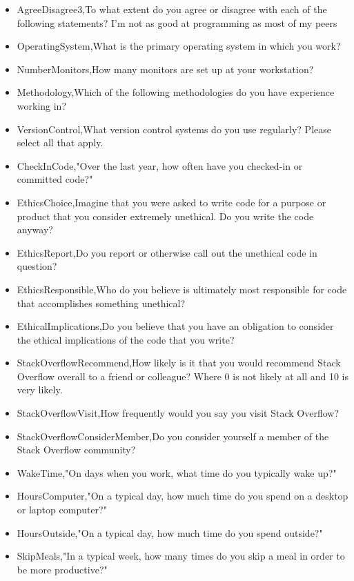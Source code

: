 \begin{appendices}
\begin{itemize}
        \item AgreeDisagree3,To what extent do you agree or disagree with each of the following statements? I'm not as good at programming as most of my peers
        \item OperatingSystem,What is the primary operating system in which you work?
        \item NumberMonitors,How many monitors are set up at your workstation?
        \item Methodology,Which of the following methodologies do you have experience working in?
        \item VersionControl,What version control systems do you use regularly? Please select all that apply.
        \item CheckInCode,"Over the last year, how often have you checked-in or committed code?"
        \item EthicsChoice,Imagine that you were asked to write code for a purpose or product that you consider extremely unethical. Do you write the code anyway?
        \item EthicsReport,Do you report or otherwise call out the unethical code in question?
        \item EthicsResponsible,Who do you believe is ultimately most responsible for code that accomplishes something unethical?
        \item EthicalImplications,Do you believe that you have an obligation to consider the ethical implications of the code that you write?
        \item StackOverflowRecommend,How likely is it that you would recommend Stack Overflow overall to a friend or colleague? Where 0 is not likely at all and 10 is very likely.
        \item StackOverflowVisit,How frequently would you say you visit Stack Overflow?
        \item StackOverflowConsiderMember,Do you consider yourself a member of the Stack Overflow community?
        \item WakeTime,"On days when you work, what time do you typically wake up?"
        \item HoursComputer,"On a typical day, how much time do you spend on a desktop or laptop computer?"
        \item HoursOutside,"On a typical day, how much time do you spend outside?"
        \item SkipMeals,"In a typical week, how many times do you skip a meal in order to be more productive?"

\end{itemize}
\end{appendices}
